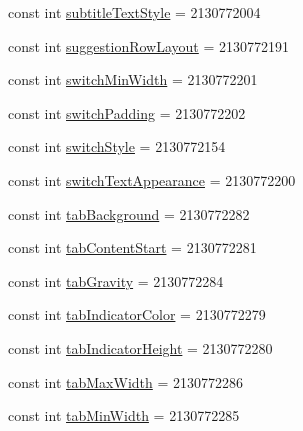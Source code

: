 \begin{DoxyCompactItemize}
\item 
const int \mbox{\hyperlink{class_f_w_p_s___app_1_1_droid_1_1_resource_1_1_attribute_a848268c6b006f0de774bb41cad676864}{subtitle\+Text\+Style}} = 2130772004
\item 
const int \mbox{\hyperlink{class_f_w_p_s___app_1_1_droid_1_1_resource_1_1_attribute_a51a7fa5166faff5214b9ecdfc2bbcd8e}{suggestion\+Row\+Layout}} = 2130772191
\item 
const int \mbox{\hyperlink{class_f_w_p_s___app_1_1_droid_1_1_resource_1_1_attribute_a003b64ecabb0017149e3de88470aa8a2}{switch\+Min\+Width}} = 2130772201
\item 
const int \mbox{\hyperlink{class_f_w_p_s___app_1_1_droid_1_1_resource_1_1_attribute_a15b1d12e7c3c76cb0c3638a0f53e37cf}{switch\+Padding}} = 2130772202
\item 
const int \mbox{\hyperlink{class_f_w_p_s___app_1_1_droid_1_1_resource_1_1_attribute_a559441278b578c032a00dc3b4307300e}{switch\+Style}} = 2130772154
\item 
const int \mbox{\hyperlink{class_f_w_p_s___app_1_1_droid_1_1_resource_1_1_attribute_ab4e222210c8e68542dbd45f890a35c90}{switch\+Text\+Appearance}} = 2130772200
\item 
const int \mbox{\hyperlink{class_f_w_p_s___app_1_1_droid_1_1_resource_1_1_attribute_a7728fc8ca66b7e36b9a9c32f11f1e6eb}{tab\+Background}} = 2130772282
\item 
const int \mbox{\hyperlink{class_f_w_p_s___app_1_1_droid_1_1_resource_1_1_attribute_aafdd7e1f0f3a3a2485cbed32d9b93601}{tab\+Content\+Start}} = 2130772281
\item 
const int \mbox{\hyperlink{class_f_w_p_s___app_1_1_droid_1_1_resource_1_1_attribute_ad24ce6e07dad077b4569dd945adda13b}{tab\+Gravity}} = 2130772284
\item 
const int \mbox{\hyperlink{class_f_w_p_s___app_1_1_droid_1_1_resource_1_1_attribute_abfd6e4b772c573046e5532de3eba7b25}{tab\+Indicator\+Color}} = 2130772279
\item 
const int \mbox{\hyperlink{class_f_w_p_s___app_1_1_droid_1_1_resource_1_1_attribute_a635086ada60e2c75d2dea2bbec8401d2}{tab\+Indicator\+Height}} = 2130772280
\item 
const int \mbox{\hyperlink{class_f_w_p_s___app_1_1_droid_1_1_resource_1_1_attribute_aef158099cf1e11d6ea646e9e7c66ff7b}{tab\+Max\+Width}} = 2130772286
\item 
const int \mbox{\hyperlink{class_f_w_p_s___app_1_1_droid_1_1_resource_1_1_attribute_a3cf3c90880e74d20dbd557b6bfeed7cd}{tab\+Min\+Width}} = 2130772285
\item 

\end{DoxyCompactItemize}
